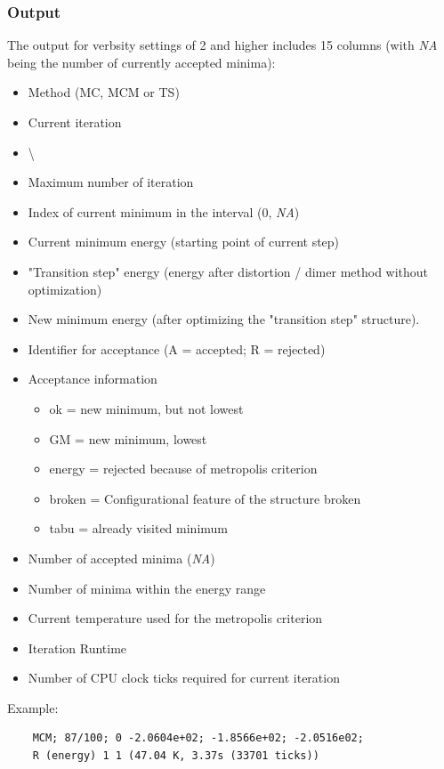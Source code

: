 \documentclass[10pt,a4paper]{article} %
\newif\ifdevmode %
\begin{document}
	\subsubsection{Output}
	The output for verbsity settings of 2 and higher includes 15 columns (with \textit{NA} being the number of currently accepted minima):\\
	\begin{itemize}
		\item Method (\ac{MC}, \ac{MCM} or \ac{TS})
		\item Current iteration
		\item \textbackslash \ifdevmode \colorbox{red}{I guess that means blank line, does it?} \fi
		\item Maximum number of iteration
		\item Index of current minimum in the interval (0, \textit{NA})
		\item Current minimum energy (starting point of current step)
		\item "Transition step" energy (energy after distortion / dimer method without optimization)
		\item New minimum energy (after optimizing the "transition step" structure).
		\item Identifier for acceptance (A = accepted; R = rejected)
		\item Acceptance information
		\begin{itemize}
			\item ok = new minimum, but not lowest
			\item GM = new minimum, lowest
			\item energy = rejected because of metropolis criterion
			\item broken = Configurational feature of the structure broken
			\item tabu = already visited minimum
		\end{itemize}
		\item Number of accepted minima (\textit{NA})
		\item Number of minima within the energy range
		\item Current temperature used for the metropolis criterion
		\item Iteration Runtime
		\item Number of CPU clock ticks required for current iteration
	\end{itemize}
	
	Example:\\
	\begin{lstlisting}
	MCM; 87/100; 0 -2.0604e+02; -1.8566e+02; -2.0516e02;
	R (energy) 1 1 (47.04 K, 3.37s (33701 ticks))
	\end{lstlisting}
\end{document}
